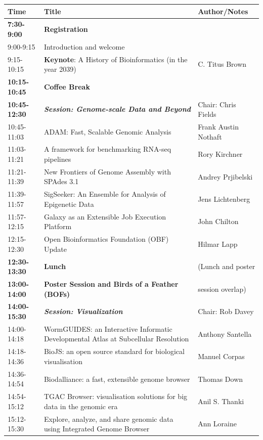 \documentclass[12pt,oneside]{article}
\begin{document}
{\small
\begin{center}
\begin{tabular}{|p{2.175cm}|p{10.5cm}|p{3.7cm}|}
\hline
Time & Title & Author/Notes \\
\hline
\textbf{7:30-9:00} & \textbf{Registration} &\\
\hline
9:00-9:15 & Introduction and welcome &\\
9:15-10:15 & \textbf{Keynote}: A History of Bioinformatics (in the year 2039) & C. Titus Brown\\
\hline
\textbf{10:15-10:45} & \textbf{Coffee Break} &\\
\hline
\textbf{10:45-12:30} & \textbf{\textit{Session: Genome-scale Data and Beyond}} & Chair: Chris Fields\\
10:45-11:03 & ADAM: Fast, Scalable Genomic Analysis & Frank Austin Nothaft\\
11:03-11:21 & A framework for benchmarking RNA-seq pipelines & Rory Kirchner\\
11:21-11:39 & New Frontiers of Genome Assembly with SPAdes 3.1 & Andrey Prjibelski\\
11:39-11:57 & SigSeeker: An Ensemble for Analysis of Epigenetic Data & Jens Lichtenberg\\
11:57-12:15 & Galaxy as an Extensible Job Execution Platform & John Chilton\\
\hline
12:15-12:30 & Open Bioinformatics Foundation (OBF) Update & Hilmar Lapp\\
\hline
\textbf{12:30-13:30} & \textbf{Lunch} & (Lunch and poster\\
\textbf{13:00-14:00} & \textbf{Poster Session and Birds of a Feather (BOFs)} & session overlap)\\
\hline
\textbf{14:00-15:30} & \textbf{\textit{Session: Visualization}} & Chair: Rob Davey\\
14:00-14:18 & WormGUIDES: an Interactive Informatic Developmental Atlas at Subcellular Resolution & Anthony Santella\\
14:18-14:36 & BioJS: an open source standard for biological visualisation & Manuel Corpas\\
14:36-14:54 & Biodalliance: a fast, extensible genome browser & Thomas Down\\
14:54-15:12 & TGAC Browser: visualisation solutions for big data in the genomic era & Anil S. Thanki\\
15:12-15:30 & Explore, analyze, and share genomic data using Integrated Genome Browser & Ann Loraine\\
\hline

\end{tabular}
\end{center}}
\end{document}
